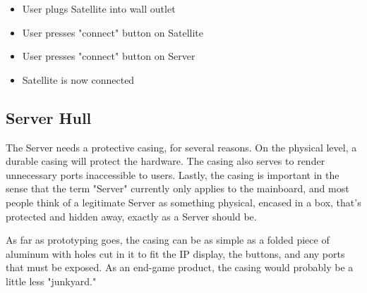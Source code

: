 \begin{itemize}
	\item User plugs Satellite into wall outlet
	\item User presses "connect" button on Satellite
	\item User presses "connect" button on Server
	\item Satellite is now connected
\end{itemize}
	
\subsection{Server Hull}
The Server needs a protective casing, for several reasons. 
On the physical level, a durable casing will protect the hardware. 
The casing also serves to render unnecessary ports inaccessible to users. 
Lastly, the casing is important in the sense that the term "Server" currently only applies to the mainboard, 
and most people think of a legitimate Server as something physical, encased in a box, that's protected and hidden away, exactly as a Server should be.

As far as prototyping goes, the casing can be as simple as a folded piece of aluminum
with holes cut in it to fit the IP display, the buttons, and any ports that must be
exposed. As an end-game product, the casing would probably be a little less "junkyard."
